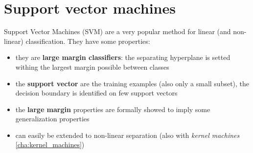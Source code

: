 \chapter{Support vector machines}
\label{cha:SVMs}

Support Vector Machines (SVM) are a very popular method for linear (and non-linear)
classification. They have some properties:
\begin{itemize}
	\item they are \textbf{large margin classifiers}: the separating hyperplane is
		setted withing the largest margin possible between classes

	\item the \textbf{support vector} are the training examples (also only a small
		subset), the decision boundary is identified on few support vectors

	\item the \textbf{large margin} properties are formally showed to imply some
		generalization properties

	\item can easily be extended to non-linear separation (also with \textit{kernel
		machines} \ref{cha:kernel_machines})
\end{itemize}

